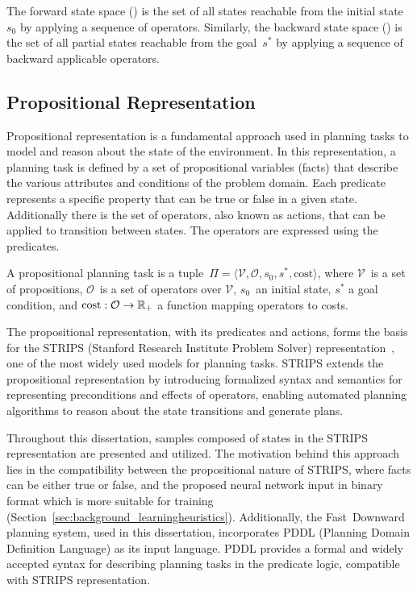 The forward state space (\fssp) is the set of all states reachable from the initial state~$s_0$ by applying a sequence of operators. Similarly, the backward state space (\bssp) is the set of all partial states reachable from the goal~$s^*$ by applying a sequence of backward applicable operators.

\subsection{Propositional Representation}
\label{sec:background_strips}

Propositional representation is a fundamental approach used in planning tasks to model and reason about the state of the environment. In this representation, a planning task is defined by a set of propositional variables (facts) that describe the various attributes and conditions of the problem domain. Each predicate represents a specific property that can be true or false in a given state. Additionally there is the set of operators, also known as actions, that can be applied to transition between states. The operators are expressed using the predicates.

\begin{definition}\label{def:sasplanningtask}
    A propositional planning task is a tuple~$\Pi=\langle\mathcal{V},\mathcal{O},s_0,s^*, \text{cost}\rangle$, where $\mathcal{V}$~is a set of propositions, $\mathcal{O}$~is a set of operators over $\mathcal{V}$, $s_0$~an initial state, $s^*$ a goal condition, and $\text{cost}:\mathcal{O}\rightarrow\mathbb{R}_{+}$ a function mapping operators to costs.
\end{definition}

The propositional representation, with its predicates and actions, forms the basis for the STRIPS (Stanford Research Institute Problem Solver) representation~\cite{Fikes.Nilsson/1971}, one of the most widely used models for planning tasks. STRIPS extends the propositional representation by introducing formalized syntax and semantics for representing preconditions and effects of operators, enabling automated planning algorithms to reason about the state transitions and generate plans.

Throughout this dissertation, samples composed of states in the STRIPS representation are presented and utilized. The motivation behind this approach lies in the compatibility between the propositional nature of STRIPS, where facts can be either true or false, and the proposed neural network input in binary format which is more suitable for training (Section~\ref{sec:background_learningheuristics}). Additionally, the Fast~Downward planning system, used in this dissertation, incorporates PDDL (Planning Domain Definition Language) as its input language. PDDL provides a formal and widely accepted syntax for describing planning tasks in the predicate logic, compatible with STRIPS representation.

